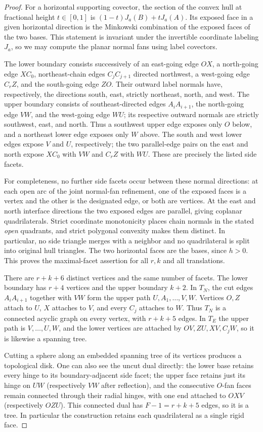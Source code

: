 \documentclass[a4paper,11pt]{amsart}
\begin{document}
\begin{proof}
For a horizontal supporting covector, the section of the convex hull at fractional height $t\in[0,1]$ is $(1-t)J_a(B)+tJ_a(A)$. Its exposed face in a given horizontal direction is the Minkowski combination of the exposed faces of the two bases. This statement is invariant under the invertible coordinate labeling $J_a$, so we may compute the planar normal fans using label covectors.

The lower boundary consists successively of an east-going edge $OX$, a north-going edge $XC_0$, northeast-chain edges $C_jC_{j+1}$ directed northwest, a west-going edge $C_rZ$, and the south-going edge $ZO$. Their outward label normals have, respectively, the directions south, east, strictly northeast, north, and west. The upper boundary consists of southeast-directed edges $A_iA_{i+1}$, the north-going edge $VW$, and the west-going edge $WU$; its respective outward normals are strictly southwest, east, and north. Thus a southwest upper edge exposes only $O$ below, and a northeast lower edge exposes only $W$ above. The south and west lower edges expose $V$ and $U$, respectively; the two parallel-edge pairs on the east and north expose $XC_0$ with $VW$ and $C_rZ$ with $WU$. These are precisely the listed side facets.

For completeness, no further side facets occur between these normal directions: at each open arc of the joint normal-fan refinement, one of the exposed faces is a vertex and the other is the designated edge, or both are vertices. At the east and north interface directions the two exposed edges are parallel, giving coplanar quadrilaterals. Strict coordinate monotonicity places chain normals in the stated \emph{open} quadrants, and strict polygonal convexity makes them distinct. In particular, no side triangle merges with a neighbor and no quadrilateral is split into original hull triangles. The two horizontal faces are the bases, since $h>0$. This proves the maximal-facet assertion for all $r,k$ and all translations.

There are $r+k+6$ distinct vertices and the same number of facets. The lower boundary has $r+4$ vertices and the upper boundary $k+2$. In $T_N$, the cut edges $A_iA_{i+1}$ together with $VW$ form the upper path $U,A_1,\ldots,V,W$. Vertices $O,Z$ attach to $U$, $X$ attaches to $V$, and every $C_j$ attaches to $W$. Thus $T_N$ is a connected acyclic graph on every vertex, with $r+k+5$ edges. In $T_E$ the upper path is $V,\ldots,U,W$, and the lower vertices are attached by $OV,ZU,XV,C_jW$, so it is likewise a spanning tree.

Cutting a sphere along an embedded spanning tree of its vertices produces a topological disk. One can also see the uncut dual directly: the lower base retains every hinge to its boundary-adjacent side facet; the upper face retains just its hinge on $UW$ (respectively $VW$ after reflection), and the consecutive $O$-fan faces remain connected through their radial hinges, with one end attached to $OXV$ (respectively $OZU$). This connected dual has $F-1=r+k+5$ edges, so it is a tree. In particular the construction retains each quadrilateral as a single rigid face.
\end{proof}
\end{document}
